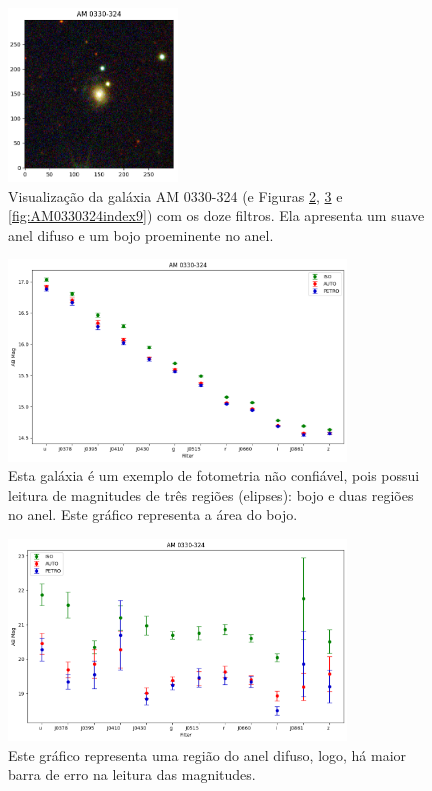 \begin{figure}[h]
  \centering 
  \includegraphics[width=0.4\textwidth]{Imagens/AM0330324.png} 
  \caption[Galáxia AM 0330-324 com a combinação dos doze filtros.]{Visualização da galáxia AM 0330-324 (e Figuras \ref{fig:AM0330324index16}, \ref{fig:AM0330324index4} e \ref{fig:AM0330324index9}) com os doze filtros. Ela apresenta um suave anel difuso e um bojo proeminente no anel.}
  \label{fig:AM0330324} 
\end{figure}

\begin{figure}[!h]
  \centering 
  \includegraphics[width=0.8\textwidth]{Imagens/AM0330324index16.png} 
  \caption[Magnitudes da galáxia AM 0330-324.]{Esta galáxia é um exemplo de fotometria não confiável, pois possui leitura de magnitudes de três regiões (elipses): bojo e duas regiões no anel. Este gráfico representa a área do bojo.}
  \label{fig:AM0330324index16} 
\end{figure}

\begin{figure}[!h]
  \centering 
  \includegraphics[width=0.8\textwidth]{Imagens/AM0330324index4.png} 
  \caption[Magnitudes da galáxia AM 0330-324.]{Este gráfico representa uma região do anel difuso, logo, há maior barra de erro na leitura das magnitudes.}
  \label{fig:AM0330324index4} 
\end{figure}

